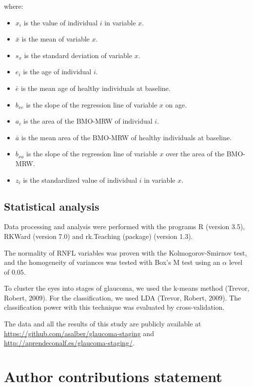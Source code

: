 \documentclass[fleqn,10pt]{wlscirep}
\begin{document}
where:
\begin{itemize}
\setlength\itemsep{0pt}
\item[] $x_i$ is the value of individual $i$ in variable $x$.
\item[] $\bar x$ is the mean of variable $x$.
\item[] $s_x$ is the standard deviation of variable $x$.
\item[] $e_i$ is the age of individual $i$.
\item[] $\bar e$ is the mean age of healthy individuals at baseline.
\item[] $b_{xe}$ is the slope of the regression line of variable $x$ on age.
\item[] $a_i$ is the area of the BMO-MRW of individual $i$.
\item[] $\bar a$ is the mean area of the BMO-MRW of healthy individuals at baseline.
\item[] $b_{xa}$ is the slope of the regression line of variable $x$ over the area of the BMO-MRW.
\item[] $z_i$ is the standardized value of individual $i$ in variable $x$.
\end{itemize}

\subsection*{Statistical analysis}

Data processing and analysis were performed with the programs R (version 3.5), RKWard (version 7.0) and rk.Teaching (package) (version 1.3)\cite{sanchez:2015:bringing}. 

The normality of RNFL variables was proven with the Kolmogorov-Smirnov test, and the homogeneity of variances was tested with Box’s M test using an $\alpha$ level of $0.05$.

To cluster the eyes into stages of glaucoma, we used the k-means method (Trevor, Robert, 2009). For the classification, we used LDA (Trevor, Robert, 2009). The classification power with this technique was evaluated by cross-validation. 

The data and all the results of this study are publicly available at \url{https://github.com/asalber/glaucoma-staging} and \url{http://aprendeconalf.es/glaucoma-staging/}.



\section*{Author contributions statement}
\end{document}
